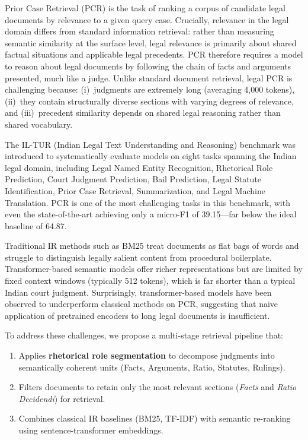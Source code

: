 \documentclass[11pt]{article}
\begin{document}
Prior Case Retrieval (PCR) is the task of ranking a corpus of candidate legal documents by relevance to a given query case.
Crucially, relevance in the legal domain differs from standard information retrieval: rather than measuring semantic similarity at the surface level, legal relevance is primarily about shared factual situations and applicable legal precedents.
PCR therefore requires a model to reason about legal documents by following the chain of facts and arguments presented, much like a judge.
Unlike standard document retrieval, legal PCR is challenging because: (i)~judgments are extremely long (averaging 4,000 tokens), (ii)~they contain structurally diverse sections with varying degrees of relevance, and (iii)~precedent similarity depends on shared legal reasoning rather than shared vocabulary.

The IL-TUR (Indian Legal Text Understanding and Reasoning) benchmark \cite{iltur2024} was introduced to systematically evaluate models on eight tasks spanning the Indian legal domain, including Legal Named Entity Recognition, Rhetorical Role Prediction, Court Judgment Prediction, Bail Prediction, Legal Statute Identification, Prior Case Retrieval, Summarization, and Legal Machine Translation.
PCR is one of the most challenging tasks in this benchmark, with even the state-of-the-art achieving only a micro-F1 of 39.15---far below the ideal baseline of 64.87.

Traditional IR methods such as BM25 treat documents as flat bags of words and struggle to distinguish legally salient content from procedural boilerplate.
Transformer-based semantic models offer richer representations but are limited by fixed context windows (typically 512 tokens), which is far shorter than a typical Indian court judgment.
Surprisingly, transformer-based models have been observed to underperform classical methods on PCR, suggesting that naive application of pretrained encoders to long legal documents is insufficient.

To address these challenges, we propose a multi-stage retrieval pipeline that:
\begin{enumerate}
    \item Applies \textbf{rhetorical role segmentation} to decompose judgments into semantically coherent units (Facts, Arguments, Ratio, Statutes, Rulings).
    \item Filters documents to retain only the most relevant sections (\emph{Facts} and \emph{Ratio Decidendi}) for retrieval.
    \item Combines classical IR baselines (BM25, TF-IDF) with semantic re-ranking using sentence-transformer embeddings.
\end{enumerate}
\end{document}
